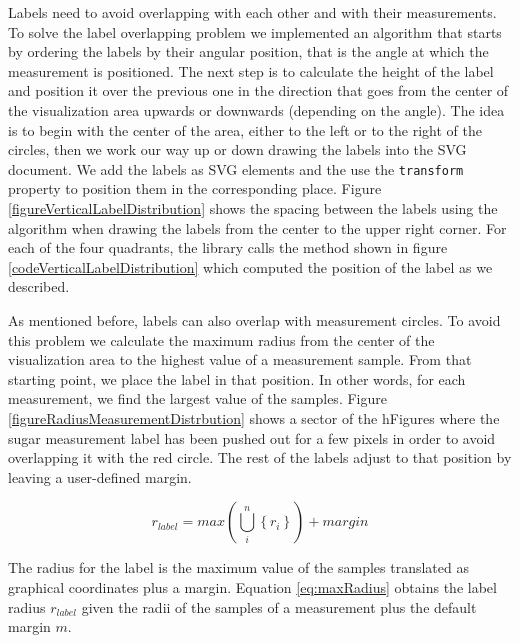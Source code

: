 \documentclass[twocolumn]{bmcart}%
\begin{document}

Labels need to avoid overlapping with each other and with their measurements. To solve the label overlapping problem we implemented an algorithm that starts by ordering the labels by their angular position, that is the angle at which the measurement is positioned. The next step is to calculate the height of the label and position it over the previous one in the direction that goes from the center of the visualization area upwards or downwards (depending on the angle). The idea is to begin with the center of the area, either to the left or to the right of the circles, then we work our way up or down drawing the labels into the SVG document. We add the labels as SVG elements and the use the \texttt{transform} property to position them in the corresponding place. Figure \ref{figureVerticalLabelDistribution} shows the spacing between the labels using the algorithm when drawing the labels from the center to the upper right corner. For each of the four quadrants, the library calls the method shown in figure \ref{codeVerticalLabelDistribution} which computed the position of the label as we described.

As mentioned before, labels can also overlap with measurement circles. To avoid this problem we calculate the maximum radius from the center of the visualization area to the highest value of a measurement sample. From that starting point, we place the label in that position. In other words, for each measurement, we find the largest value of the samples. Figure \ref{figureRadiusMeasurementDistrbution} shows a sector of the hFigures where the sugar measurement label has been pushed out for a few pixels in order to avoid overlapping it with the red circle. The rest of the labels adjust to that position by leaving a user-defined margin.

\begin{equation} \label{eq:maxRadius}
	r_{label} = max(\bigcup_{i}^{n} \left \{ r_{i} \right \} ) + \textit{margin}
\end{equation}

The radius for the label is the maximum value of the samples translated as graphical coordinates plus a margin. Equation \ref{eq:maxRadius} obtains the label radius $r_{label}$ given the radii of the samples of a measurement plus the default margin $m$.

\end{document}
